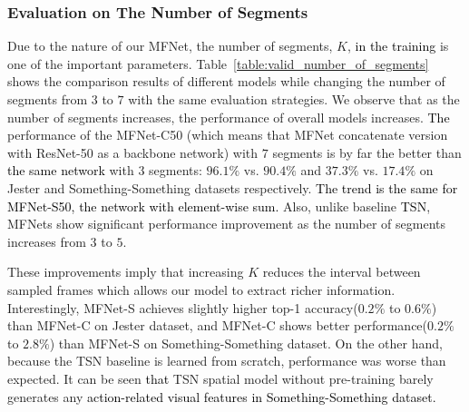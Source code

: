 \documentclass[runningheads]{llncs}
\newcommand{\nj}[1]{\textcolor{black}{#1}}
\begin{document}
\subsubsection{Evaluation on The Number of Segments}
Due to the nature of our MFNet, the number of segments, $K$, \nj{in the training} is one of the important parameters. Table~\ref{table:valid_number_of_segments} shows the comparison results of different models while changing the number of segments from $3$ to $7$ with the same evaluation strategies. 
We observe that as the number of segments increases, the performance of overall models increases. \nj{The} performance of the MFNet-C50 (which means that MFNet concatenate version with ResNet-50 as a backbone network) with $7$ segments is by far the better than \nj{the same network} with $3$ segments: $96.1\%$ vs. $90.4\%$ and $37.3\%$ vs. $17.4\%$ on Jester and Something-Something datasets respectively. \nj{The trend is the same for MFNet-S50, the network with element-wise sum.} Also, unlike baseline \nj{TSN}, MFNets show significant performance improvement as the number of segments increases from $3$ to $5$. 

These improvements imply that increasing $K$ reduces the interval between sampled frames which allows our model to extract richer information. Interestingly, MFNet-S achieves slightly higher top-1 accuracy($0.2\%$ to $0.6\%$) than MFNet-C on Jester dataset, and MFNet-C shows better performance($0.2\%$ to $2.8\%$) than MFNet-S on Something-Something dataset. On the other hand, because the TSN baseline is learned from scratch, performance was worse than expected. It can be seen \nj{that} TSN spatial model without pre-training barely generates any \nj{action-related visual features in Something-Something dataset.
}
\end{document}
